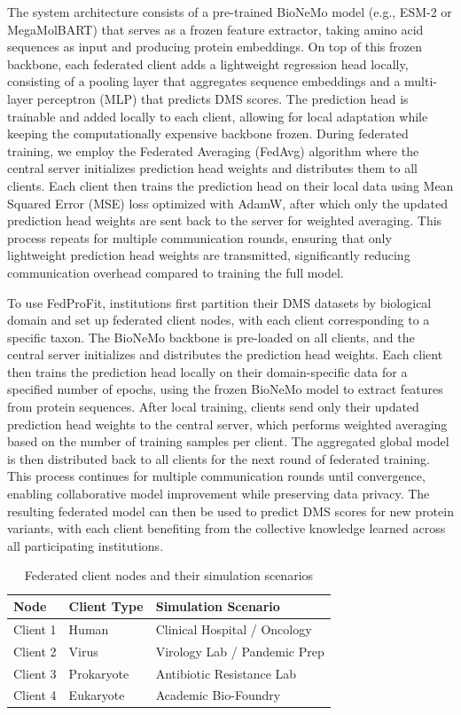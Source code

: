 \documentclass[11pt]{article}
\begin{document}
The system architecture consists of a pre-trained BioNeMo model \cite{BioNeMo2024} (e.g., ESM-2 or MegaMolBART) that serves as a frozen feature extractor, taking amino acid sequences as input and producing protein embeddings. On top of this frozen backbone, each federated client adds a lightweight regression head locally, consisting of a pooling layer that aggregates sequence embeddings and a multi-layer perceptron (MLP) that predicts DMS scores. The prediction head is trainable and added locally to each client, allowing for local adaptation while keeping the computationally expensive backbone frozen. During federated training, we employ the Federated Averaging (FedAvg) algorithm \cite{McMahan2017} where the central server initializes prediction head weights and distributes them to all clients. Each client then trains the prediction head on their local data using Mean Squared Error (MSE) loss optimized with AdamW, after which only the updated prediction head weights are sent back to the server for weighted averaging. This process repeats for multiple communication rounds, ensuring that only lightweight prediction head weights are transmitted, significantly reducing communication overhead compared to training the full model.

To use FedProFit, institutions first partition their DMS datasets by biological domain and set up federated client nodes, with each client corresponding to a specific taxon. The BioNeMo backbone \cite{BioNeMo2024} is pre-loaded on all clients, and the central server initializes and distributes the prediction head weights. Each client then trains the prediction head locally on their domain-specific data for a specified number of epochs, using the frozen BioNeMo model to extract features from protein sequences. After local training, clients send only their updated prediction head weights to the central server, which performs weighted averaging based on the number of training samples per client. The aggregated global model is then distributed back to all clients for the next round of federated training. This process continues for multiple communication rounds until convergence, enabling collaborative model improvement while preserving data privacy. The resulting federated model can then be used to predict DMS scores for new protein variants, with each client benefiting from the collective knowledge learned across all participating institutions.


\begin{table}[h]
\centering
\caption{Federated client nodes and their simulation scenarios}
\label{tab:clients}
\begin{tabular}{@{}lll@{}}
\toprule
\textbf{Node} & \textbf{Client Type} & \textbf{Simulation Scenario} \\
\midrule
Client 1 & Human & Clinical Hospital / Oncology \\
Client 2 & Virus & Virology Lab / Pandemic Prep \\
Client 3 & Prokaryote & Antibiotic Resistance Lab \\
Client 4 & Eukaryote & Academic Bio-Foundry \\
\bottomrule
\end{tabular}
\end{table}
\end{document}
